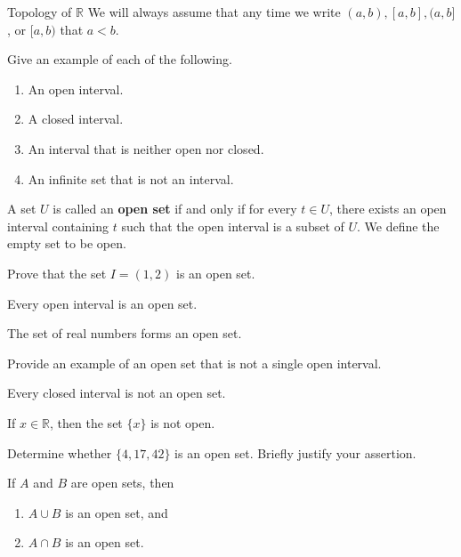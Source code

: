 \begin{section}{Topology of $\mathbb{R}$}
We will always assume that any time we write $(a,b), [a,b], (a,b]$, or $[a,b)$ that $a<b$. 

\begin{problem}
Give an example of each of the following.
\begin{enumerate}[label=\textrm{(\alph*)}]
\item An open interval.
\item A closed interval.
\item An interval that is neither open nor closed.
\item An infinite set that is not an interval.
\end{enumerate}
\end{problem}

\begin{definition}
A set $U$ is called an \textbf{open set} if and only if for every $t \in U$, there exists an open interval containing $t$ such that the open interval is a subset of $U$.  We define the empty set to be open.\end{definition}

\begin{problem} 
Prove that the set $I=(1,2)$ is an open set.
\end{problem}

\begin{theorem}
Every open interval is an open set. 
\end{theorem}

\begin{theorem}
The set of real numbers forms an open set.
\end{theorem}

\begin{problem}
Provide an example of an open set that is not a single open interval.
\end{problem}

\begin{theorem}
Every closed interval is not an open set.
\end{theorem}

\begin{theorem}
If $x\in\mathbb{R}$, then the set $\{x\}$ is not open.
\end{theorem}

\begin{problem} 
Determine whether $\{4,17,42\}$ is an open set. Briefly justify your assertion. 
\end{problem}

\begin{theorem}\label{finite union of open sets}
If $A$ and $B$ are open sets, then 
\begin{enumerate}[label=\textrm{(\alph*)}]
\item $A\cup B$ is an open set, and
\item $A\cap B$ is an open set.
\end{enumerate}
\end{theorem}


\end{section}
